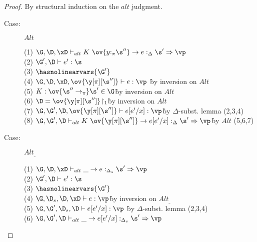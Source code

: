 \begin{proof}
By structural induction on the $alt$ judgment.

\begin{description}
\item[Case:] $Alt$
\begin{tabbing}
    (1) $\G, \D, \xD \vdash_{alt} K~\ov{y{:}_\pi\s''} \to e :_\Delta \s' \Rightarrow \vp$\\
    (2) $\G', \D \vdash e' : \s$\\
    (3) $\hasnolinearvars{\G'}$\\
    (4) $\G, \D, \xD, \ov{\y[\pi][\s'']} \vdash e : \vp$ \` by inversion on $Alt$\\
    (5) $K : \ov{\s'' \to_\pi} \s' \in \G$\` by inversion on $Alt$\\
    (6) $\D = \ov{\y[\pi][\s'']}\!\upharpoonright_1$\` by inversion on $Alt$\\
    (7) $\G,\G',\D,\ov{\y[\pi][\s'']} \vdash e[e'/x] : \vp$\` by $\Delta$-subst. lemma (2,3,4)\\
    (8) $\G, \G', \D \vdash_{alt} K~\ov{\y[\pi][\s'']} \to e[e'/x] :_\Delta \s' \Rightarrow \vp$\` by $Alt$ (5,6,7)\\
\end{tabbing}

\item[Case:] $Alt_\_$
\begin{tabbing}
    (1) $\G, \D, \xD \vdash_{alt} \_ \to e :_{\Delta_s} \s' \Rightarrow \vp$\\
    (2) $\G', \D \vdash e' : \s$\\
    (3) $\hasnolinearvars{\G'}$\\
    (4) $\G, \D_s, \D, \xD \vdash e : \vp$\` by inversion on $Alt_\_$\\
    (5) $\G, \G', \D_s, \D \vdash e[e'/x] : \vp$ \` by $\Delta$-subst. lemma (2,3,4)\\
    (6) $\G ,\G', \D \vdash_{alt} \_ \to e[e'/x] :_{\Delta_s} \s' \Rightarrow \vp$\\
\end{tabbing}
\end{description}

\end{proof}

